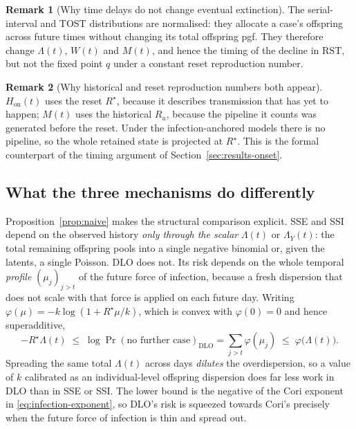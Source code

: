 \documentclass[11pt,a4paper]{article}
\theoremstyle{plain}
\theoremstyle{definition}
\newtheorem*{remark}{Remark}
\newcommand{\Rreset}{R^{\star}}
\newcommand{\RST}{\mathrm{RST}}
\newcommand{\dlo}{DLO}
\newcommand{\sse}{SSE}
\newcommand{\ssi}{SSI}
\newcommand{\cori}{Cori}
\newcommand{\mdlo}{\mathrm{DLO}}
\begin{document}
\begin{remark}[Why time delays do not change eventual extinction]
The serial-interval and TOST distributions are normalised: they allocate a case's offspring
across future times without changing its total offspring pgf. They therefore change
$\Lambda(t)$, $W(t)$ and $M(t)$, and hence the timing of the decline in $\RST$, but not the
fixed point $q$ under a constant reset reproduction number.
\end{remark}

\begin{remark}[Why historical and reset reproduction numbers both appear]
$H_{\mathrm{on}}(t)$ uses the reset $\Rreset$, because it describes transmission that has yet to
happen;
$M(t)$ uses the historical $R_u$, because the pipeline it counts was generated before the reset.
Under the infection-anchored models there is no pipeline, so the whole retained state is projected
at $\Rreset$. This is the formal counterpart of the timing argument of
Section~\ref{sec:results-onset}.
\end{remark}

\subsection{What the three mechanisms do differently}
\label{sec:structure}

Proposition~\ref{prop:naive} makes the structural comparison explicit. \sse{} and \ssi{} depend
on the observed history \emph{only through the scalar} $\Lambda(t)$ or $\Lambda_Y(t)$: the total
remaining offspring pools into a single negative binomial or, given the latents, a single
Poisson. \dlo{} does not. Its risk depends on the whole temporal \emph{profile}
$(\mu_j)_{j>t}$ of the future force of infection, because a fresh dispersion that does not scale
with that force is applied on each future day. Writing
$\varphi(\mu) = -k\log(1+\Rreset\mu/k)$, which is convex with $\varphi(0) = 0$ and hence
superadditive,
\begin{equation}
  -\Rreset\Lambda(t) \;\le\; \log \Pr(\text{no further case})_{\mdlo}
  = \sum_{j>t}\varphi(\mu_j)
  \;\le\; \varphi\bigl(\Lambda(t)\bigr).
  \label{eq:dlo-bounds}
\end{equation}
Spreading the same total $\Lambda(t)$ across days \emph{dilutes} the overdispersion, so a value
of $k$ calibrated as an individual-level offspring dispersion does far less work in \dlo{} than
in \sse{} or \ssi{}. The lower bound is the negative of the \cori{} exponent in
\eqref{eq:infection-exponent}, so
\dlo{}'s risk is squeezed towards \cori{}'s precisely when the future force of infection is thin
and spread out.
\end{document}
